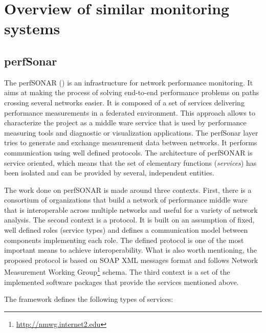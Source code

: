 
\section{Overview of similar monitoring systems} \label{sec:ch2_similar}


\subsection{perfSonar}

The perfSONAR (\cite{perfSonar1,perfSonar2,perfSonar3}) is an infrastructure for network performance monitoring. It aims at making the process of solving end-to-end performance problems on paths crossing several networks easier. It is composed of a set of services delivering performance measurements in a federated environment. This approach allows to characterize the project as a middle ware service that is used by performance measuring tools and diagnostic or visualization applications. The perfSonar layer tries to generate and exchange measurement data between networks. It performs communication using well defined protocols. The architecture of perfSONAR is service oriented, which means that the set of elementary functions (\emph{services}) has been isolated and can be provided by several, independent entities.

The work done on perfSONAR is made around three contexts. First, there is a consortium of organizations that build a network of performance middle ware that is interoperable across multiple networks and useful for a variety of network analysis. The second context is a protocol. It is built on an assumption of fixed, well defined roles (service types) and defines a communication model between components implementing each role. The defined protocol is one of the most important means to achieve interoperability. What is also worth mentioning, the proposed protocol is based on SOAP XML messages format and follows Network Measurement Working Group\footnote{\url{http://nmwg.internet2.edu}} schema. The third context is a set of the implemented software packages that provide the services mentioned above.

The framework defines the following types of services:


